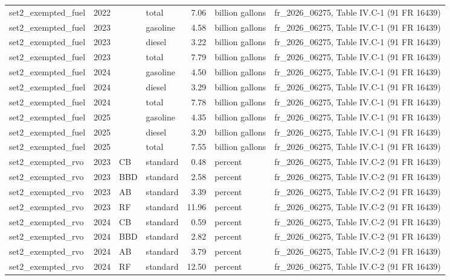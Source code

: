 \begin{longtable}{p{2.3cm}p{0.7cm}p{1.0cm}p{2.6cm}rp{1.7cm}p{4.6cm}}
set2\_exempted\_fuel & 2022 &  & total & 7.06 & billion gallons & fr\_2026\_06275, Table IV.C-1 (91 FR 16439) \\
set2\_exempted\_fuel & 2023 &  & gasoline & 4.58 & billion gallons & fr\_2026\_06275, Table IV.C-1 (91 FR 16439) \\
set2\_exempted\_fuel & 2023 &  & diesel & 3.22 & billion gallons & fr\_2026\_06275, Table IV.C-1 (91 FR 16439) \\
set2\_exempted\_fuel & 2023 &  & total & 7.79 & billion gallons & fr\_2026\_06275, Table IV.C-1 (91 FR 16439) \\
set2\_exempted\_fuel & 2024 &  & gasoline & 4.50 & billion gallons & fr\_2026\_06275, Table IV.C-1 (91 FR 16439) \\
set2\_exempted\_fuel & 2024 &  & diesel & 3.29 & billion gallons & fr\_2026\_06275, Table IV.C-1 (91 FR 16439) \\
set2\_exempted\_fuel & 2024 &  & total & 7.78 & billion gallons & fr\_2026\_06275, Table IV.C-1 (91 FR 16439) \\
set2\_exempted\_fuel & 2025 &  & gasoline & 4.35 & billion gallons & fr\_2026\_06275, Table IV.C-1 (91 FR 16439) \\
set2\_exempted\_fuel & 2025 &  & diesel & 3.20 & billion gallons & fr\_2026\_06275, Table IV.C-1 (91 FR 16439) \\
set2\_exempted\_fuel & 2025 &  & total & 7.55 & billion gallons & fr\_2026\_06275, Table IV.C-1 (91 FR 16439) \\
set2\_exempted\_rvo & 2023 & CB & standard & 0.48 & percent & fr\_2026\_06275, Table IV.C-2 (91 FR 16439) \\
set2\_exempted\_rvo & 2023 & BBD & standard & 2.58 & percent & fr\_2026\_06275, Table IV.C-2 (91 FR 16439) \\
set2\_exempted\_rvo & 2023 & AB & standard & 3.39 & percent & fr\_2026\_06275, Table IV.C-2 (91 FR 16439) \\
set2\_exempted\_rvo & 2023 & RF & standard & 11.96 & percent & fr\_2026\_06275, Table IV.C-2 (91 FR 16439) \\
set2\_exempted\_rvo & 2024 & CB & standard & 0.59 & percent & fr\_2026\_06275, Table IV.C-2 (91 FR 16439) \\
set2\_exempted\_rvo & 2024 & BBD & standard & 2.82 & percent & fr\_2026\_06275, Table IV.C-2 (91 FR 16439) \\
set2\_exempted\_rvo & 2024 & AB & standard & 3.79 & percent & fr\_2026\_06275, Table IV.C-2 (91 FR 16439) \\
set2\_exempted\_rvo & 2024 & RF & standard & 12.50 & percent & fr\_2026\_06275, Table IV.C-2 (91 FR 16439) \\

\end{longtable}
